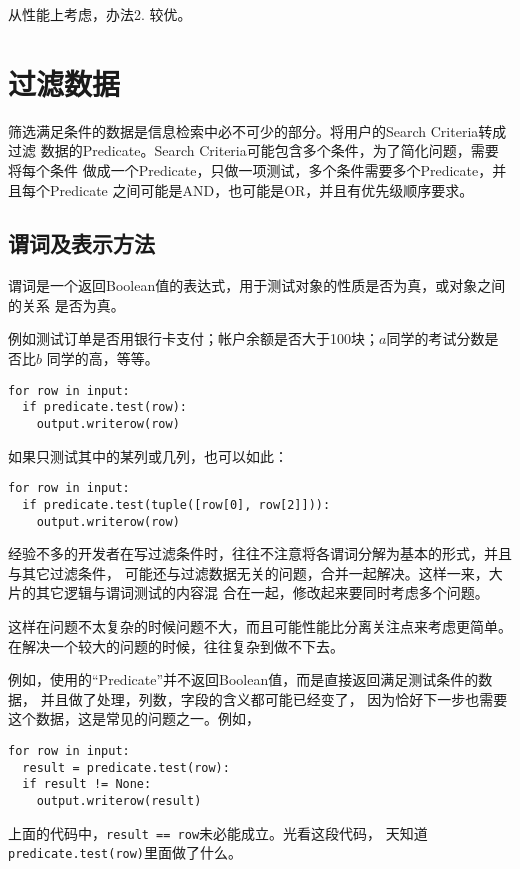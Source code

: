 \documentclass[11pt]{article}
\newcommand{\id}[1]{\texttt{#1}}
\begin{document}
从性能上考虑，办法2. 较优。

\section{过滤数据}
筛选满足条件的数据是信息检索中必不可少的部分。将用户的Search Criteria转成过滤
数据的Predicate。Search Criteria可能包含多个条件，为了简化问题，需要将每个条件
做成一个Predicate，只做一项测试，多个条件需要多个Predicate，并且每个Predicate
之间可能是AND，也可能是OR，并且有优先级顺序要求。

\subsection{谓词及表示方法}
谓词是一个返回Boolean值的表达式，用于测试对象的性质是否为真，或对象之间的关系
是否为真。

例如测试订单是否用银行卡支付；帐户余额是否大于100块；$a$同学的考试分数是否比$b$
同学的高，等等。
\begin{lstlisting}
for row in input:
  if predicate.test(row):
    output.writerow(row)
\end{lstlisting}
如果只测试其中的某列或几列，也可以如此：
\begin{lstlisting}
for row in input:
  if predicate.test(tuple([row[0], row[2]])):
    output.writerow(row)
\end{lstlisting}

经验不多的开发者在写过滤条件时，往往不注意将各谓词分解为基本的形式，并且与其它过滤条件，
可能还与过滤数据无关的问题，合并一起解决。这样一来，大片的其它逻辑与谓词测试的内容混
合在一起，修改起来要同时考虑多个问题。

这样在问题不太复杂的时候问题不大，而且可能性能比分离关注点来考虑更简单。
在解决一个较大的问题的时候，往往复杂到做不下去。

例如，使用的“Predicate”并不返回Boolean值，而是直接返回满足测试条件的数据，
并且做了处理，列数，字段的含义都可能已经变了，
因为恰好下一步也需要这个数据，这是常见的问题之一。例如，
\begin{lstlisting}
for row in input:
  result = predicate.test(row):
  if result != None:
    output.writerow(result)
\end{lstlisting}
上面的代码中，\id{result == row}未必能成立。光看这段代码，
天知道\id{predicate.test(row)}里面做了什么。
\end{document}

